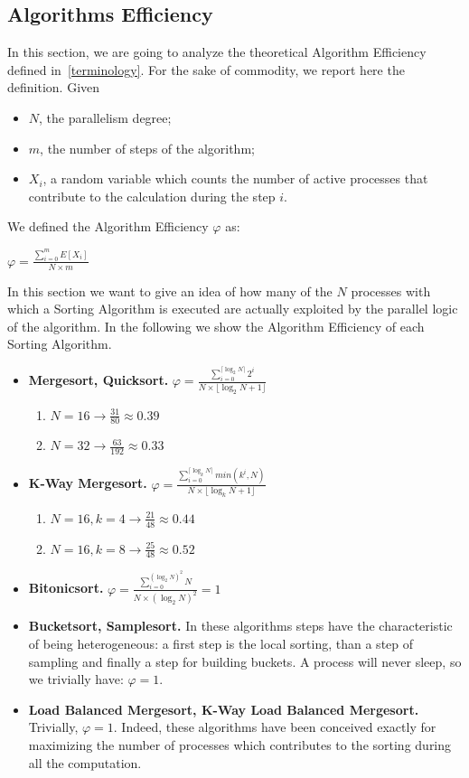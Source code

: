\subsection{Algorithms Efficiency}
In this section, we are going to analyze the theoretical Algorithm Efficiency defined in~\ref{terminology}. For the sake of commodity, we report here the definition. Given
\begin{itemize}
\item $N$, the parallelism degree; 
\item $m$, the number of steps of the algorithm;
\item $X_i$, a random variable which counts the number of active processes that contribute to the calculation during the step $i$.
\end{itemize}
We defined the Algorithm Efficiency $\varphi$ as:
\begin{center}
$\varphi = \frac{\sum_{i=0}^m E[X_i]}{N \times m} $
\end{center}
In this section we want to give an idea of how many of the $N$ processes with which a Sorting Algorithm is executed are actually exploited by the parallel logic of the algorithm. In the following we show the Algorithm Efficiency of each Sorting Algorithm.

\begin{itemize}
\item \textbf{Mergesort, Quicksort.} $\varphi = \frac{\sum_{i=0}^{ \lceil \log_2{N} \rceil} 2^i}{N \times \lfloor \log_2{N} + 1 \rfloor} $
\begin{enumerate}
\item $N = 16 \rightarrow \frac{31}{80} \approx 0.39$
\item $N = 32 \rightarrow \frac{63}{192} \approx 0.33$
\end{enumerate}

\item \textbf{K-Way Mergesort.} $\varphi = \frac{\sum_{i=0}^{ \lceil \log_k{N} \rceil} min ( k^i, N )}{N \times \lfloor \log_k{N} + 1 \rfloor } $
\begin{enumerate}
\item $N = 16, k = 4 \rightarrow \frac{21}{48} \approx 0.44$
\item $N = 16, k = 8 \rightarrow \frac{25}{48} \approx 0.52$
\end{enumerate}

\item \textbf{Bitonicsort.} $\varphi = \frac{\sum_{i=0}^{(\log_2{N})^2} N}{N \times (\log_2{N})^2} = 1 $
\item \textbf{Bucketsort, Samplesort.} In these algorithms steps have the characteristic of being heterogeneous: a first step is the local sorting, than a step of sampling and finally a step for building buckets. A process will never sleep, so we trivially have: $\varphi = 1$.

\item \textbf{Load Balanced Mergesort, K-Way Load Balanced Mergesort.} Trivially, $\varphi = 1$. Indeed, these algorithms have been conceived exactly for maximizing the number of processes which contributes to the sorting during all the computation.

\end{itemize}

